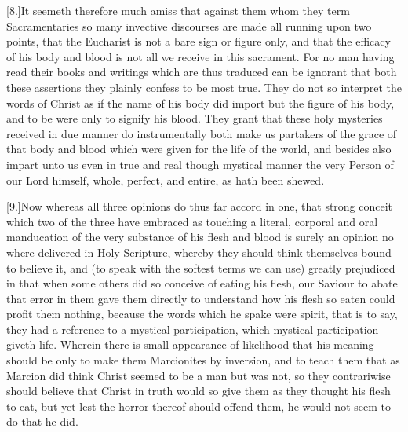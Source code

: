 [8.]It seemeth therefore much amiss that against them whom they term Sacramentaries so many invective discourses are made all running upon two points, that the Eucharist is not a bare sign or figure only, and that the efficacy of his body and blood is not all we receive in this sacrament. For no man having read their books and writings which are thus traduced can be ignorant that both these assertions they plainly confess to be most true. They do not so interpret the words of Christ as if the name of his body did import but the figure of his body, and to be were only to signify his blood. They grant that these holy mysteries received in due manner do instrumentally both make us partakers of the grace of that body and blood which were given for the life of the world, and besides also impart unto us even in true and real though mystical manner the very Person of our Lord himself, whole, perfect, and entire, as hath been shewed.

[9.]Now whereas all three opinions do thus far accord in one, that strong conceit which two of the three have embraced as touching a literal, corporal and oral manducation of the very substance of his flesh and blood is surely an opinion no where delivered in Holy Scripture, whereby they should think themselves bound to believe it, and (to speak with the softest terms we can use) greatly prejudiced in that when some others did so conceive of eating his flesh, our Saviour to abate that error in them gave them directly to understand how his flesh so eaten could profit them nothing, because the words which he spake were spirit, that is to say, they had a  reference to a mystical participation, which mystical participation giveth life.
 Wherein there is small appearance of likelihood that his meaning should be only to make them Marcionites by inversion, and to teach them that as Marcion did think Christ seemed to be a man but was not, so they contrariwise should believe that Christ in truth would so give them as they thought his flesh to eat, but yet lest the horror thereof should offend them, he would not seem to do that he did.

